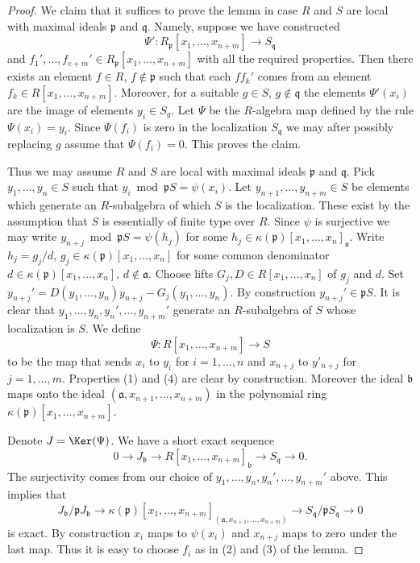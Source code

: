 \begin{proof}
We claim that it suffices to prove the lemma in case $R$
and $S$ are local with maximal ideals $\mathfrak p$ and $\mathfrak q$.
Namely, suppose we have constructed
$$
\Psi' : R_{\mathfrak p}[x_1, \ldots, x_{n + m}]
\longrightarrow
S_{\mathfrak q}
$$
and $f_1', \ldots, f_{e + m}' \in R_{\mathfrak p}[x_1, \ldots, x_{n + m}]$
with all the required properties. Then there exists an element
$f \in R$, $f \not \in \mathfrak p$ such that each
$ff_k'$ comes from an element $f_k \in R[x_1, \ldots, x_{n + m}]$.
Moreover, for a suitable $g \in S$, $g \not \in \mathfrak q$
the elements $\Psi'(x_i)$ are the image of elements
$y_i \in S_g$. Let $\Psi$ be the $R$-algebra map defined
by the rule $\Psi(x_i) = y_i$. Since $\Psi(f_i)$ is zero
in the localization $S_{\mathfrak q}$ we may after possibly
replacing $g$ assume that $\Psi(f_i) = 0$. This proves the claim.

\medskip\noindent
Thus we may assume $R$ and $S$ are local
with maximal ideals $\mathfrak p$ and $\mathfrak q$.
Pick $y_1, \ldots, y_n \in S$ such that
$y_i \bmod \mathfrak pS = \psi(x_i)$.
Let $y_{n + 1}, \ldots, y_{n + m} \in S$ be elements which generate
an $R$-subalgebra of which $S$ is the localization.
These exist by the assumption that $S$ is essentially of
finite type over $R$. Since $\psi$ is surjective we
may write $y_{n + j} \bmod \mathfrak pS = \psi(h_j)$ for
some $h_j \in \kappa(\mathfrak p)[x_1, \ldots, x_n]_{\mathfrak a}$.
Write $h_j = g_j/d$, $g_j \in \kappa(\mathfrak p)[x_1, \ldots, x_n]$
for some common denominator $d \in \kappa(\mathfrak p)[x_1, \ldots, x_n]$,
$d \not \in \mathfrak a$. Choose lifts $G_j, D \in R[x_1, \ldots, x_n]$
of $g_j$ and $d$. Set
$y_{n + j}' = D(y_1, \ldots, y_n) y_{n + j} - G_j(y_1, \ldots, y_n)$.
By construction $y_{n + j}' \in \mathfrak p S$.
It is clear that $y_1, \ldots, y_n, y_n', \ldots, y_{n + m}'$
generate an $R$-subalgebra of $S$ whose localization is $S$.
We define
$$
\Psi : R[x_1, \ldots, x_{n + m}] \to S
$$
to be the map that sends $x_i$ to $y_i$ for $i = 1, \ldots, n$
and $x_{n + j}$ to $y'_{n + j}$ for $j = 1, \ldots, m$. Properties
(1) and (4) are clear by construction. Moreover the ideal
$\mathfrak b$ maps onto the ideal
$(\mathfrak a, x_{n + 1}, \ldots, x_{n + m})$
in the polynomial ring $\kappa(\mathfrak p)[x_1, \ldots, x_{n + m}]$.

\medskip\noindent
Denote $J = \Ker(\Psi)$. We have a short exact sequence
$$
0 \to J_{\mathfrak b}
\to R[x_1, \ldots, x_{n + m}]_{\mathfrak b}
\to S_{\mathfrak q}
\to 0.
$$
The surjectivity comes from our choice of
$y_1, \ldots, y_n, y_n', \ldots, y_{n + m}'$ above.
This implies that
$$
J_{\mathfrak b}/ \mathfrak pJ_{\mathfrak b}
\to \kappa(\mathfrak p)[x_1, \ldots, x_{n + m}]_{
(\mathfrak a, x_{n + 1}, \ldots, x_{n + m})}
\to S_{\mathfrak q}/\mathfrak pS_{\mathfrak q}
\to 0
$$
is exact. By construction $x_i$ maps to $\psi(x_i)$ and
$x_{n + j}$ maps to zero under the last map.
Thus it is easy to choose $f_i$ as in
(2) and (3) of the lemma.
\end{proof}

